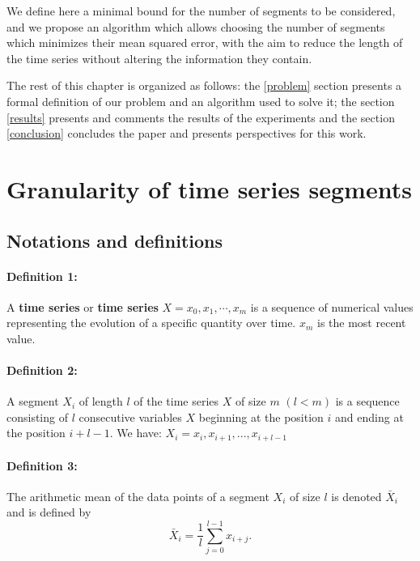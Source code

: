  
 
 We define here a minimal bound for the number of segments to be considered, and we propose an algorithm which allows choosing the number of segments which minimizes their mean squared error, with the aim to reduce the length of the time series without altering the information they contain.
 
 
  The rest of this chapter is organized as follows: the \ref{problem} section presents a formal definition of our problem and an algorithm used to solve it; the section \ref{results} presents and comments the results of the experiments and the section \ref{conclusion} concludes the paper and presents perspectives for this work.
 

\section{Granularity of time series segments}
\label{probleme}


\subsection{Notations and definitions}
\paragraph{Definition 1:} A \textbf{time series} or \textbf{time series}
$ X = x_{0}, x_{1}, \cdots, x_{m} $ is a sequence of numerical values representing the evolution of a specific quantity over time. $ x_{m} $ is the most recent value.

\paragraph{Definition 2:} A segment $ X_{i} $ of length $ l $ of the time series
$ X $ of size $ m $ $ (l <m) $ is a sequence consisting of $ l $ consecutive variables
$ X $ beginning at the  position  $ i $  and ending at the position $ i + l-1 $.
We have: $ X_{i} = x_{i}, x_{i + 1}, ..., x_{i + l-1} $

\paragraph{Definition 3:} The arithmetic mean of the data points of a segment $ X_{i} $ of size $ l $ is
denoted $ \bar {X}_{i} $ and is defined by
\[
\bar{X}_{i} = \frac{1}{l} \sum_{j = 0}^{l-1} x_{i + j}.
\]



